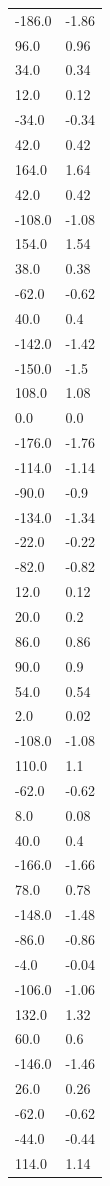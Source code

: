\begin{longtable}{ll}
-186.0 & -1.86 \\
96.0 & 0.96 \\
34.0 & 0.34 \\
12.0 & 0.12 \\
-34.0 & -0.34 \\
42.0 & 0.42 \\
164.0 & 1.64 \\
42.0 & 0.42 \\
-108.0 & -1.08 \\
154.0 & 1.54 \\
38.0 & 0.38 \\
-62.0 & -0.62 \\
40.0 & 0.4 \\
-142.0 & -1.42 \\
-150.0 & -1.5 \\
108.0 & 1.08 \\
0.0 & 0.0 \\
-176.0 & -1.76 \\
-114.0 & -1.14 \\
-90.0 & -0.9 \\
-134.0 & -1.34 \\
-22.0 & -0.22 \\
-82.0 & -0.82 \\
12.0 & 0.12 \\
20.0 & 0.2 \\
86.0 & 0.86 \\
90.0 & 0.9 \\
54.0 & 0.54 \\
2.0 & 0.02 \\
-108.0 & -1.08 \\
110.0 & 1.1 \\
-62.0 & -0.62 \\
8.0 & 0.08 \\
40.0 & 0.4 \\
-166.0 & -1.66 \\
78.0 & 0.78 \\
-148.0 & -1.48 \\
-86.0 & -0.86 \\
-4.0 & -0.04 \\
-106.0 & -1.06 \\
132.0 & 1.32 \\
60.0 & 0.6 \\
-146.0 & -1.46 \\
26.0 & 0.26 \\
-62.0 & -0.62 \\
-44.0 & -0.44 \\
114.0 & 1.14 \\

\end{longtable}
